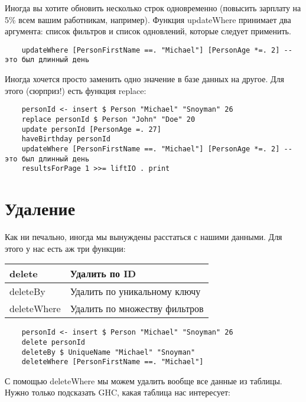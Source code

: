 Иногда вы хотите обновить несколько строк одновременно (повысить зарплату на 5\% всем вашим работникам, например). Функция updateWhere принимает два аргумента: список фильтров и список одновлений, которые следует применить. %

\begin{lstlisting}
    updateWhere [PersonFirstName ==. "Michael"] [PersonAge *=. 2] -- это был длинный день
\end{lstlisting}

Иногда хочется просто заменить одно значение в базе данных на другое. Для этого (сюрприз!) есть функция replace:

\begin{lstlisting}
    personId <- insert $ Person "Michael" "Snoyman" 26
    replace personId $ Person "John" "Doe" 20
    update personId [PersonAge =. 27]
    haveBirthday personId
    updateWhere [PersonFirstName ==. "Michael"] [PersonAge *=. 2] -- это был длинный день
    resultsForPage 1 >>= liftIO . print
\end{lstlisting}%

\section{Удаление} %

Как ни печально, иногда мы вынуждены расстаться с нашими данными. Для этого у нас есть аж три функции:

\begin{center}
\begin{tabular}{ | l | l |}
\hline
delete & Удалить по ID \\ \hline
deleteBy & Удалить по уникальному ключу \\ \hline
deleteWhere & Удалить по множеству фильтров \\ \hline
\end{tabular}
\end{center}

\begin{lstlisting}
    personId <- insert $ Person "Michael" "Snoyman" 26
    delete personId
    deleteBy $ UniqueName "Michael" "Snoyman"
    deleteWhere [PersonFirstName ==. "Michael"]
\end{lstlisting}%

С помощью deleteWhere мы можем удалить вообще все данные из таблицы. Нужно только подсказать GHC, какая таблица нас интересует:

